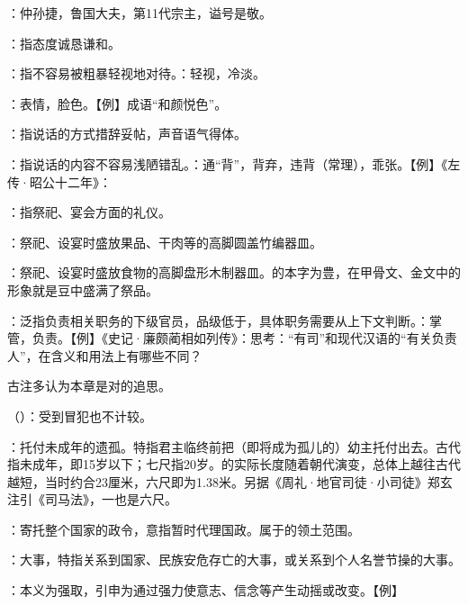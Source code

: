 {
\item {}：仲孙捷，鲁国大夫，第11代宗主，谥号是敬。
\item {}：指态度诚恳谦和。
\item {}：指不容易被粗暴轻视地对待。：轻视，冷淡。
\item {}：表情，脸色。【例】成语“和颜悦色”。
\item {}：指说话的方式措辞妥帖，声音语气得体。
\item {}：指说话的内容不容易浅陋错乱。：通“背”，背弃，违背（常理），乖张。【例】《左传·昭公十二年》：
\item {}：指祭祀、宴会方面的礼仪。

：祭祀、设宴时盛放果品、干肉等的高脚圆盖竹编器皿。%

：祭祀、设宴时盛放食物的高脚盘形木制器皿。的本字为豊，在甲骨文、金文中的形象就是豆中盛满了祭品。

\item {}：泛指负责相关职务的下级官员，品级低于，具体职务需要从上下文判断。：掌管，负责。【例】《史记·廉颇蔺相如列传》：思考：“有司”和现代汉语的“有关负责人”，在含义和用法上有哪些不同？
}
{}


{
古注多认为本章是对的追思。
\begin{lyitemize}
\item {}（）：受到冒犯也不计较。
\end{lyitemize}
}
{}


{
\item {}：托付未成年的遗孤。特指君主临终前把（即将成为孤儿的）幼主托付出去。古代指未成年，即15岁以下；七尺指20岁。的实际长度随着朝代演变，总体上越往古代越短，当时约合23厘米，六尺即为1.38米。另据《周礼·地官司徒·小司徒》郑玄注引《司马法》，一也是六尺。
\item {}：寄托整个国家的政令，意指暂时代理国政。属于的领土范围。

\item {}：大事，特指关系到国家、民族安危存亡的大事，或关系到个人名誉节操的大事。
\item {}：本义为强取，引申为通过强力使意志、信念等产生动摇或改变。【例】 
}
{}


